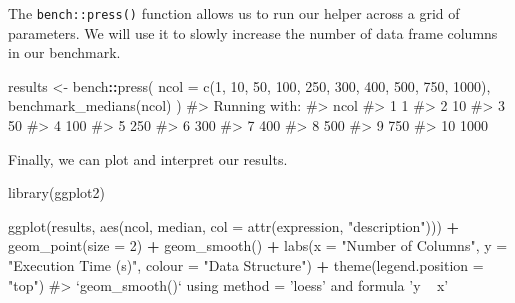 \documentclass[
]{krantz}
\makeatletter
\newenvironment{Shaded}{\begin{snugshade}}{\end{snugshade}}
\newcommand{\CommentTok}[1]{\textcolor[rgb]{0.56,0.35,0.01}{\textit{#1}}}
\newcommand{\DataTypeTok}[1]{\textcolor[rgb]{0.13,0.29,0.53}{#1}}
\newcommand{\DecValTok}[1]{\textcolor[rgb]{0.00,0.00,0.81}{#1}}
\newcommand{\KeywordTok}[1]{\textcolor[rgb]{0.13,0.29,0.53}{\textbf{#1}}}
\newcommand{\NormalTok}[1]{#1}
\newcommand{\OperatorTok}[1]{\textcolor[rgb]{0.81,0.36,0.00}{\textbf{#1}}}
\newcommand{\StringTok}[1]{\textcolor[rgb]{0.31,0.60,0.02}{#1}}
\newenvironment{kframe}{%
\medskip{}
\setlength{\fboxsep}{.8em}
 \def\at@end@of@kframe{}%
 \ifinner\ifhmode%
  \def\at@end@of@kframe{\end{minipage}}%
  \begin{minipage}{\columnwidth}%
 \fi\fi%
 \def\FrameCommand##1{\hskip\@totalleftmargin \hskip-\fboxsep
 \colorbox{shadecolor}{##1}\hskip-\fboxsep
     \hskip-\linewidth \hskip-\@totalleftmargin \hskip\columnwidth}%
 \MakeFramed {\advance\hsize-\width
   \@totalleftmargin\z@ \linewidth\hsize
   \@setminipage}}%
 {\par\unskip\endMakeFramed%
 \at@end@of@kframe}
\renewenvironment{Shaded}{\begin{kframe}}{\end{kframe}}
\renewcommand{\KeywordTok} [1]{\textcolor[rgb]{0.00,0.44,0.13}{{#1}}}
\renewcommand{\DataTypeTok}[1]{\textcolor[rgb]{0.56,0.13,0.00}{{#1}}}
\renewcommand{\DecValTok}  [1]{\textcolor[rgb]{0.25,0.63,0.44}{{#1}}}
\renewcommand{\StringTok}  [1]{\textcolor[rgb]{0.25,0.44,0.63}{{#1}}}
\renewcommand{\CommentTok} [1]{\textcolor[rgb]{0.38,0.63,0.69}{{#1}}}
\renewcommand{\NormalTok}  [1]{{#1}}
\makeatother
\begin{document}
The \texttt{bench::press()} function allows us to run our helper across a grid of parameters. We will use it to slowly increase the number of data frame columns in our benchmark.

\begin{Shaded}
\begin{Highlighting}[]
\NormalTok{results <-}\StringTok{ }\NormalTok{bench}\OperatorTok{::}\KeywordTok{press}\NormalTok{(}
  \DataTypeTok{ncol =} \KeywordTok{c}\NormalTok{(}\DecValTok{1}\NormalTok{, }\DecValTok{10}\NormalTok{, }\DecValTok{50}\NormalTok{, }\DecValTok{100}\NormalTok{, }\DecValTok{250}\NormalTok{, }\DecValTok{300}\NormalTok{, }\DecValTok{400}\NormalTok{, }\DecValTok{500}\NormalTok{, }\DecValTok{750}\NormalTok{, }\DecValTok{1000}\NormalTok{),}
  \KeywordTok{benchmark_medians}\NormalTok{(ncol)}
\NormalTok{)}
\CommentTok{#> Running with:}
\CommentTok{#>     ncol}
\CommentTok{#>  1     1}
\CommentTok{#>  2    10}
\CommentTok{#>  3    50}
\CommentTok{#>  4   100}
\CommentTok{#>  5   250}
\CommentTok{#>  6   300}
\CommentTok{#>  7   400}
\CommentTok{#>  8   500}
\CommentTok{#>  9   750}
\CommentTok{#> 10  1000}
\end{Highlighting}
\end{Shaded}

Finally, we can plot and interpret our results.

\begin{Shaded}
\begin{Highlighting}[]
\KeywordTok{library}\NormalTok{(ggplot2)}

\KeywordTok{ggplot}\NormalTok{(results, }\KeywordTok{aes}\NormalTok{(ncol, median,}
                    \DataTypeTok{col =} \KeywordTok{attr}\NormalTok{(expression, }\StringTok{"description"}\NormalTok{))) }\OperatorTok{+}
\StringTok{  }\KeywordTok{geom_point}\NormalTok{(}\DataTypeTok{size =} \DecValTok{2}\NormalTok{) }\OperatorTok{+}\StringTok{ }
\StringTok{  }\KeywordTok{geom_smooth}\NormalTok{() }\OperatorTok{+}
\StringTok{  }\KeywordTok{labs}\NormalTok{(}\DataTypeTok{x =} \StringTok{"Number of Columns"}\NormalTok{,}
       \DataTypeTok{y =} \StringTok{"Execution Time (s)"}\NormalTok{,}
       \DataTypeTok{colour =} \StringTok{"Data Structure"}\NormalTok{) }\OperatorTok{+}
\StringTok{  }\KeywordTok{theme}\NormalTok{(}\DataTypeTok{legend.position =} \StringTok{"top"}\NormalTok{)}
\CommentTok{#> `geom_smooth()` using method = 'loess' and formula 'y ~ x'}
\end{Highlighting}
\end{Shaded}
\end{document}
